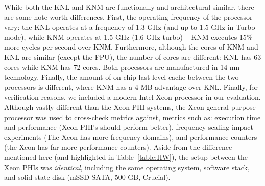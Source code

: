 While both the KNL and KNM are functionally and architectural similar, there are some note-worth differences. First, the operating frequency of the processor vary: the KNL operates at a frequency of 1.3 GHz (and up-to 1.5 GHz in Turbo mode), while KNM operates at 1.5 GHz (1.6 GHz turbo) -- KNM executes 15\% more cycles per second over KNM. Furthermore, although the cores of KNM and KNL are similar (except the FPU), the number of cores are different: KNL has 63 cores while KNM has 72 cores. Both processors are manufactured in 14 nm technology. Finally, the amount of on-chip last-level cache between the two processors is different, where KNM has a 4 MB advantage over KNL.
Finally, for verification reasons, we included a modern Intel Xeon processor in our evaluation. Although vastly different than the Xeon PHI systems, the Xeon general-purpose processor was used to cross-check metrics against, metrics such as: execution time and performance (Xeon PHI’s should perform better), frequency-scaling impact experiments (The Xeon has more frequency domains), and performance counters (the Xeon has far more performance counters).
Aside from the difference mentioned here (and highlighted in Table~\ref{table:HW}), the setup between the Xeon PHIs was \textit{identical}, including the same operating system, software stack, and solid state disk (mSSD SATA, 500 GB, Crucial).


